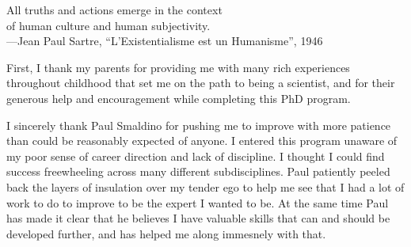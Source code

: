\documentclass[12pt,chapterheads]{UCMerced}
\begin{document}
\begin{frontmatter}
\begin{epigraph}
  All truths and actions emerge in the context \\
  of human culture and human subjectivity.\\[2em]

  ---Jean Paul Sartre, ``L'Existentialisme est un Humanisme'', 1946
\end{epigraph}

% 

\tableofcontents
\listoffigures  %
\listoftables   %



\begin{acknowledgements} 
First, I thank my parents for providing me with many rich experiences throughout
childhood that set me on the path to being a scientist,
and for their generous help and encouragement while completing this 
PhD program.

I sincerely thank Paul Smaldino for pushing me to improve with 
more patience than could be reasonably expected of anyone. 
I entered this program unaware of my poor
sense of career direction and lack of discipline.
I thought I could find success freewheeling across
many different subdisciplines. Paul patiently peeled back the layers of
insulation over my tender ego to help me see that I had a lot of work to do
to improve to be the expert I wanted to be. At the same time Paul has
made it clear that he believes I have valuable skills that can and
should be developed further, and has helped me along immesnely with that.


\end{acknowledgements}
\end{frontmatter}
\end{document}
